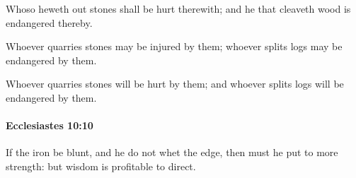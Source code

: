 			\begin{versebox}
					\item[BHS] 
					\item[LXX] 
					\item[ASV] Whoso heweth out stones shall be hurt therewith; and he that cleaveth wood is endangered thereby.
					\item[NIV] Whoever quarries stones may be injured by them; whoever splits logs may be endangered by them.
					\item[NRSV] Whoever quarries stones will be hurt by them; and whoever splits logs will be endangered by them.
			\end{versebox}

		\paragraph{Ecclesiastes 10:10} %
			\label{ECCLESIASTES-10-10}

			If the iron be blunt, and he do not whet the edge, then must he put to more strength: but wisdom is profitable to direct.

